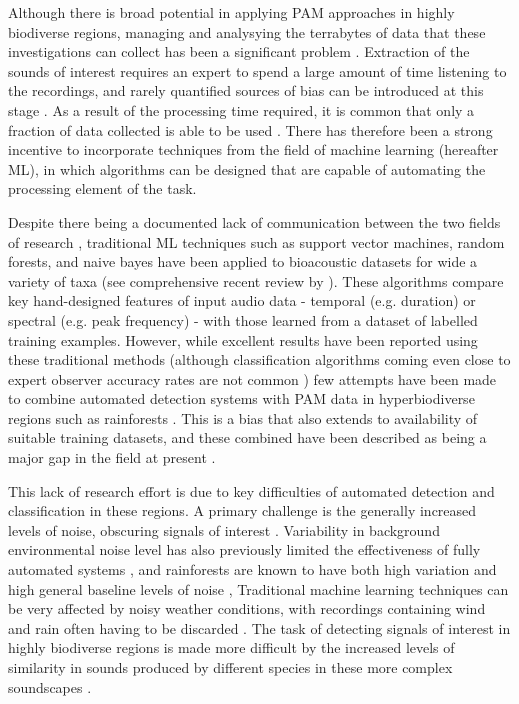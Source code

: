 \documentclass[11pt]{article}
\begin{document}
Although there is broad potential in applying PAM approaches in highly biodiverse regions, managing and analysying the terrabytes of data that these investigations can collect has been a significant problem \citep{villanueva2012pumilio,shonfield2017autonomous}. Extraction of the sounds of interest requires an expert to spend a large amount of time listening to the recordings, and rarely quantified sources of bias can be introduced at this stage \citep{digby2013practical}. As a result of the processing time required, it is common that only a fraction of data collected is able to be used \citep{kobayasi2012classification}. There has therefore been a strong incentive to incorporate techniques from the field of machine learning (hereafter ML), in which algorithms can be designed that are capable of automating the processing element of the task. 

Despite there being a documented lack of communication between the two fields of research \citep{thessen2016adoption}, traditional ML techniques such as support vector machines, random forests, and naive bayes have been applied to bioacoustic datasets for wide a variety of taxa (see comprehensive recent review by \cite{knight2017recommendations}). These algorithms compare key hand-designed features of input audio data - temporal (e.g. duration) or spectral (e.g. peak frequency) - with those learned from a dataset of labelled training examples. However, while excellent results have been reported using these traditional methods (although classification algorithms coming even close to expert observer accuracy rates are not common \citep{ovaskainen2018animal}) few attempts have been made to combine automated detection systems with PAM data in hyperbiodiverse regions such as rainforests \citep{browning2017passive}. This is a bias that also extends to availability of suitable training datasets, and these combined have been described as being a major gap in the field at present \citep{browning2017passive}.

This lack of research effort is due to key difficulties of automated detection and classification in these regions. A primary challenge is the generally increased levels of noise, obscuring signals of interest \citep{browning2017passive}. Variability in background environmental noise level has also previously limited the effectiveness of fully automated systems \citep{heinicke2015assessing}, and rainforests are known to have both high variation and high general baseline levels of noise \citep{waser1977experimental}, Traditional machine learning techniques can be very affected by noisy weather conditions, with recordings containing wind and rain often having to be discarded \citep{stowell2018automatic}. The task of detecting signals of interest in highly biodiverse regions is made more difficult by the increased levels of similarity in sounds produced by different species in these more complex soundscapes \citep{zamora2016acoustic}. 
\end{document}
